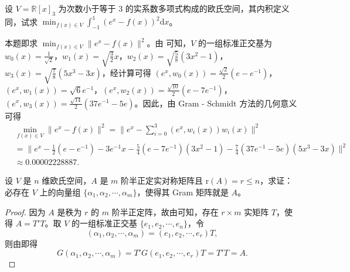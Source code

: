 \documentclass[../../main.tex]{subfiles}%
\begin{document}
\begin{example}
设 $V = \mathbb{R}[x]_3$ 为次数小于等于 3 的实系数多项式构成的欧氏空间，其内积定义同，试求 $\min_{f(x)\in V}\int_{-1}^{1}(e^x - f(x))^2\mathrm{d}x$。
\end{example}
\begin{solution}

本题即求 $\min_{f(x)\in V}\|e^x - f(x)\|^2$。由 可知，$V$ 的一组标准正交基为
$w_0(x)=\frac{1}{\sqrt{2}}$，$w_1(x)=\sqrt{\frac{3}{2}}x$，$w_2(x)=\sqrt{\frac{5}{8}}(3x^2 - 1)$，$w_3(x)=\sqrt{\frac{7}{8}}(5x^3 - 3x)$，经计算可得 $(e^x,w_0(x))=\frac{\sqrt{2}}{2}(e - e^{-1})$，$(e^x,w_1(x))=\sqrt{6}e^{-1}$，$(e^x,w_2(x))=\frac{\sqrt{10}}{2}(e - 7e^{-1})$，$(e^x,w_3(x))=\frac{\sqrt{14}}{2}(37e^{-1} - 5e)$。因此，由 Gram - Schmidt 方法的几何意义可得
\begin{align*}
&\min_{f(x)\in V}\|e^x - f(x)\|^2=\|e^x - \sum_{i = 0}^{3}(e^x,w_i(x))w_i(x)\|^2\\
&=\|e^x - \frac{1}{2}(e - e^{-1}) - 3e^{-1}x - \frac{5}{4}(e - 7e^{-1})(3x^2 - 1) - \frac{7}{4}(37e^{-1} - 5e)(5x^3 - 3x)\|^2\\
&\approx 0.00002228887.
\end{align*}

\end{solution}

\begin{proposition}\label{proposition:例9.14}
设 $V$ 是 $n$ 维欧氏空间，$A$ 是 $m$ 阶半正定实对称矩阵且 $\mathrm{r}(A)=r\leqslant  n$，求证：必存在 $V$ 上的向量组 $\{\alpha_1,\alpha_2,\cdots,\alpha_m\}$，使得其 Gram 矩阵就是 $A$。
\end{proposition}
\begin{proof}

因为 $A$ 是秩为 $r$ 的 $m$ 阶半正定阵，故由可知，存在 $r\times m$ 实矩阵 $T$，使得 $A = T'T$。取 $V$ 的一组标准正交基 $\{e_1,e_2,\cdots,e_n\}$，令
\[
(\alpha_1,\alpha_2,\cdots,\alpha_m)=(e_1,e_2,\cdots,e_r)T,
\]
则由即得
\[
G(\alpha_1,\alpha_2,\cdots,\alpha_m)=T'G(e_1,e_2,\cdots,e_r)T=T'T = A.
\]

\end{proof}
\end{document}
